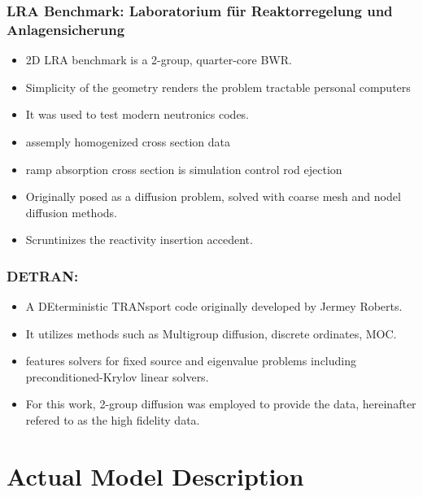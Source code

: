 \documentclass[fleqn]{beamer}
\begin{document}
\begin{frame}

\frametitle{LRA Benchmark: Laboratorium f{\"u}r Reaktorregelung und Anlagensicherung}       

\begin{itemize}
  \item 2D LRA benchmark is a 2-group, quarter-core BWR.
  \item Simplicity of the geometry renders the problem tractable personal computers
  \item  It was used to test modern neutronics codes.        
    \item assemply homogenized cross section data
    \item ramp absorption cross section is simulation control rod ejection
    \item Originally posed as a diffusion problem, solved with coarse mesh and nodel diffusion methods.
    \item Scruntinizes the reactivity insertion accedent. 
       
\end{itemize}

\end{frame}

    
\begin{frame}

\frametitle{DETRAN:}       
\begin{itemize}
       \item A DEterministic TRANsport code originally developed by Jermey Roberts.
       \item It utilizes methods such as Multigroup diffusion, discrete ordinates, MOC.
       \item features solvers for fixed source and eigenvalue problems including preconditioned-Krylov linear solvers. 
%         
    \item For this work, 2-group diffusion was employed to provide the data, hereinafter refered to as the high fidelity data.
       
  
       \end{itemize}
    \end{frame}


    \section{Actual Model Description}
\end{document}

